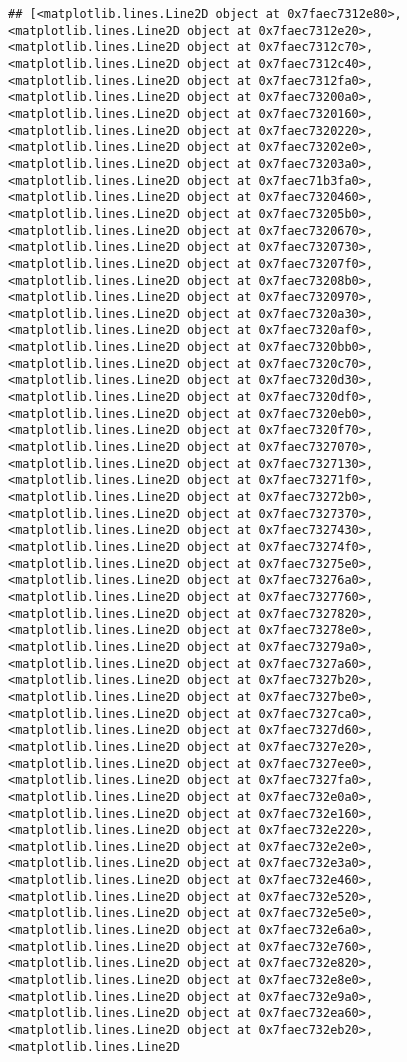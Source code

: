 \documentclass[
]{article}
\begin{document}
\begin{verbatim}
## [<matplotlib.lines.Line2D object at 0x7faec7312e80>, <matplotlib.lines.Line2D object at 0x7faec7312e20>, <matplotlib.lines.Line2D object at 0x7faec7312c70>, <matplotlib.lines.Line2D object at 0x7faec7312c40>, <matplotlib.lines.Line2D object at 0x7faec7312fa0>, <matplotlib.lines.Line2D object at 0x7faec73200a0>, <matplotlib.lines.Line2D object at 0x7faec7320160>, <matplotlib.lines.Line2D object at 0x7faec7320220>, <matplotlib.lines.Line2D object at 0x7faec73202e0>, <matplotlib.lines.Line2D object at 0x7faec73203a0>, <matplotlib.lines.Line2D object at 0x7faec71b3fa0>, <matplotlib.lines.Line2D object at 0x7faec7320460>, <matplotlib.lines.Line2D object at 0x7faec73205b0>, <matplotlib.lines.Line2D object at 0x7faec7320670>, <matplotlib.lines.Line2D object at 0x7faec7320730>, <matplotlib.lines.Line2D object at 0x7faec73207f0>, <matplotlib.lines.Line2D object at 0x7faec73208b0>, <matplotlib.lines.Line2D object at 0x7faec7320970>, <matplotlib.lines.Line2D object at 0x7faec7320a30>, <matplotlib.lines.Line2D object at 0x7faec7320af0>, <matplotlib.lines.Line2D object at 0x7faec7320bb0>, <matplotlib.lines.Line2D object at 0x7faec7320c70>, <matplotlib.lines.Line2D object at 0x7faec7320d30>, <matplotlib.lines.Line2D object at 0x7faec7320df0>, <matplotlib.lines.Line2D object at 0x7faec7320eb0>, <matplotlib.lines.Line2D object at 0x7faec7320f70>, <matplotlib.lines.Line2D object at 0x7faec7327070>, <matplotlib.lines.Line2D object at 0x7faec7327130>, <matplotlib.lines.Line2D object at 0x7faec73271f0>, <matplotlib.lines.Line2D object at 0x7faec73272b0>, <matplotlib.lines.Line2D object at 0x7faec7327370>, <matplotlib.lines.Line2D object at 0x7faec7327430>, <matplotlib.lines.Line2D object at 0x7faec73274f0>, <matplotlib.lines.Line2D object at 0x7faec73275e0>, <matplotlib.lines.Line2D object at 0x7faec73276a0>, <matplotlib.lines.Line2D object at 0x7faec7327760>, <matplotlib.lines.Line2D object at 0x7faec7327820>, <matplotlib.lines.Line2D object at 0x7faec73278e0>, <matplotlib.lines.Line2D object at 0x7faec73279a0>, <matplotlib.lines.Line2D object at 0x7faec7327a60>, <matplotlib.lines.Line2D object at 0x7faec7327b20>, <matplotlib.lines.Line2D object at 0x7faec7327be0>, <matplotlib.lines.Line2D object at 0x7faec7327ca0>, <matplotlib.lines.Line2D object at 0x7faec7327d60>, <matplotlib.lines.Line2D object at 0x7faec7327e20>, <matplotlib.lines.Line2D object at 0x7faec7327ee0>, <matplotlib.lines.Line2D object at 0x7faec7327fa0>, <matplotlib.lines.Line2D object at 0x7faec732e0a0>, <matplotlib.lines.Line2D object at 0x7faec732e160>, <matplotlib.lines.Line2D object at 0x7faec732e220>, <matplotlib.lines.Line2D object at 0x7faec732e2e0>, <matplotlib.lines.Line2D object at 0x7faec732e3a0>, <matplotlib.lines.Line2D object at 0x7faec732e460>, <matplotlib.lines.Line2D object at 0x7faec732e520>, <matplotlib.lines.Line2D object at 0x7faec732e5e0>, <matplotlib.lines.Line2D object at 0x7faec732e6a0>, <matplotlib.lines.Line2D object at 0x7faec732e760>, <matplotlib.lines.Line2D object at 0x7faec732e820>, <matplotlib.lines.Line2D object at 0x7faec732e8e0>, <matplotlib.lines.Line2D object at 0x7faec732e9a0>, <matplotlib.lines.Line2D object at 0x7faec732ea60>, <matplotlib.lines.Line2D object at 0x7faec732eb20>, <matplotlib.lines.Line2D 
\end{verbatim}
\end{document}
